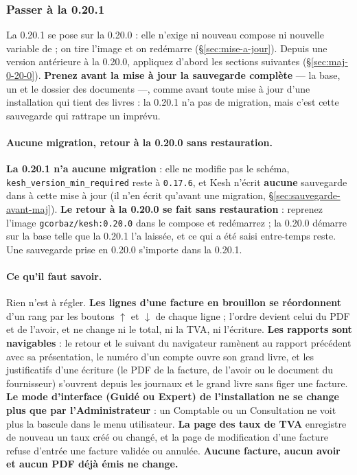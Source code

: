 \documentclass[a4paper,11pt,oneside]{article}
\begin{document}
\fussy

\subsubsection{Passer à la 0.20.1}\label{sec:maj-0-20-1}
\sloppy

La 0.20.1 se pose sur la 0.20.0 : elle n'exige ni nouveau compose ni nouvelle variable de  ; on tire l'image et on redémarre (\S\ref{sec:mise-a-jour}). Depuis une version antérieure à la 0.20.0, appliquez d'abord les sections suivantes (\S\ref{sec:maj-0-20-0}). \textbf{Prenez avant la mise à jour la sauvegarde complète} --- la base, un  et le dossier des documents ---, comme avant toute mise à jour d'une installation qui tient des livres : la 0.20.1 n'a pas de migration, mais c'est cette sauvegarde qui rattrape un imprévu.

\paragraph{Aucune migration, retour à la 0.20.0 sans restauration.} \textbf{La 0.20.1 n'a aucune migration} : elle ne modifie pas le schéma, \texttt{kesh\_version\_min\_required} reste à \texttt{0.17.6}, et Kesh n'écrit \textbf{aucune} sauvegarde dans  à cette mise à jour (il n'en écrit qu'avant une migration, \S\ref{sec:sauvegarde-avant-maj}). \textbf{Le retour à la 0.20.0 se fait sans restauration} : reprenez l'image \texttt{gcorbaz/kesh:0.20.0} dans le compose et redémarrez ; la 0.20.0 démarre sur la base telle que la 0.20.1 l'a laissée, et ce qui a été saisi entre-temps reste. Une sauvegarde  prise en 0.20.0 s'importe dans la 0.20.1.

\paragraph{Ce qu'il faut savoir.} Rien n'est à régler. \textbf{Les lignes d'une facture en brouillon se réordonnent} d'un rang par les boutons $\uparrow$ et $\downarrow$ de chaque ligne ; l'ordre devient celui du PDF et de l'avoir, et ne change ni le total, ni la TVA, ni l'écriture. \textbf{Les rapports sont navigables} : le retour et le suivant du navigateur ramènent au rapport précédent avec sa présentation, le numéro d'un compte ouvre son grand livre, et les justificatifs d'une écriture (le PDF de la facture, de l'avoir ou le document du fournisseur) s'ouvrent depuis les journaux et le grand livre sans figer une facture. \textbf{Le mode d'interface (Guidé ou Expert) de l'installation ne se change plus que par l'Administrateur} : un Comptable ou un Consultation ne voit plus la bascule dans le menu utilisateur. \textbf{La page des taux de TVA} enregistre de nouveau un taux créé ou changé, et la page de modification d'une facture refuse d'entrée une facture validée ou annulée. \textbf{Aucune facture, aucun avoir et aucun PDF déjà émis ne change.}
\end{document}
